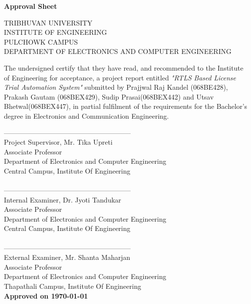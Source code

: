 
\begin{center}
	\begin{Large}
		\textbf{Approval Sheet}\\[1cm]
	\end{Large}
	\vfill
	TRIBHUVAN UNIVERSITY\\
	INSTITUTE OF ENGINEERING\\
	PULCHOWK CAMPUS\\
	DEPARTMENT OF ELECTRONICS AND COMPUTER ENGINEERING\\
\end{center}
The undersigned certify that they have read, and recommended to the Institute of Engineering for acceptance, a project report entitled \emph{"RTLS Based License Trial Automation System"}  submitted by Prajjwal Raj Kandel (068BE428), Prakash Gautam (068BEX429), Sudip Prasai(068BEX442) and Utsav Bhetwal(068BEX447), in partial fulfilment of the requirements for the Bachelor’s degree in Electronics and Communication Engineering.

--------------------------------------------------------\\
Project Supervisor, 
Mr. Tika Upreti\\
Associate Professor \\
Department of Electronics 
and Computer Engineering \\
Central Campus,
Institute Of Engineering \\
\\
--------------------------------------------------------\\
Internal Examiner, 
Dr. Jyoti Tandukar \\
Associate Professor \\
Department of Electronics 
and Computer Engineering \\
Central Campus,
Institute Of Engineering \\
\\
--------------------------------------------------------\\
External Examiner, 
Mr. Shanta Maharjan \\
Associate Professor\\
Department of Electronics 
and Computer Engineering \\
Thapathali Campus,
Institute Of Engineering \\
\textbf{Approved on \today}

